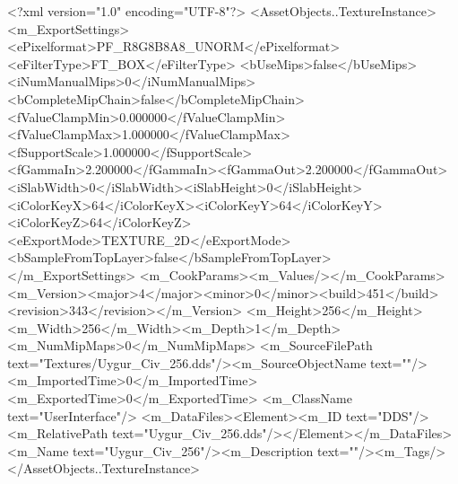 <?xml version="1.0" encoding="UTF-8"?>
<AssetObjects..TextureInstance>
  <m_ExportSettings>
    <ePixelformat>PF_R8G8B8A8_UNORM</ePixelformat><eFilterType>FT_BOX</eFilterType>
    <bUseMips>false</bUseMips><iNumManualMips>0</iNumManualMips><bCompleteMipChain>false</bCompleteMipChain>
    <fValueClampMin>0.000000</fValueClampMin><fValueClampMax>1.000000</fValueClampMax><fSupportScale>1.000000</fSupportScale>
    <fGammaIn>2.200000</fGammaIn><fGammaOut>2.200000</fGammaOut><iSlabWidth>0</iSlabWidth><iSlabHeight>0</iSlabHeight>
    <iColorKeyX>64</iColorKeyX><iColorKeyY>64</iColorKeyY><iColorKeyZ>64</iColorKeyZ>
    <eExportMode>TEXTURE_2D</eExportMode><bSampleFromTopLayer>false</bSampleFromTopLayer>
  </m_ExportSettings>
  <m_CookParams><m_Values/></m_CookParams>
  <m_Version><major>4</major><minor>0</minor><build>451</build><revision>343</revision></m_Version>
  <m_Height>256</m_Height><m_Width>256</m_Width><m_Depth>1</m_Depth><m_NumMipMaps>0</m_NumMipMaps>
  <m_SourceFilePath text="Textures/Uygur_Civ_256.dds"/><m_SourceObjectName text=""/>
  <m_ImportedTime>0</m_ImportedTime><m_ExportedTime>0</m_ExportedTime>
  <m_ClassName text="UserInterface"/>
  <m_DataFiles><Element><m_ID text="DDS"/><m_RelativePath text="Uygur_Civ_256.dds"/></Element></m_DataFiles>
  <m_Name text="Uygur_Civ_256"/><m_Description text=""/><m_Tags/>
</AssetObjects..TextureInstance>
